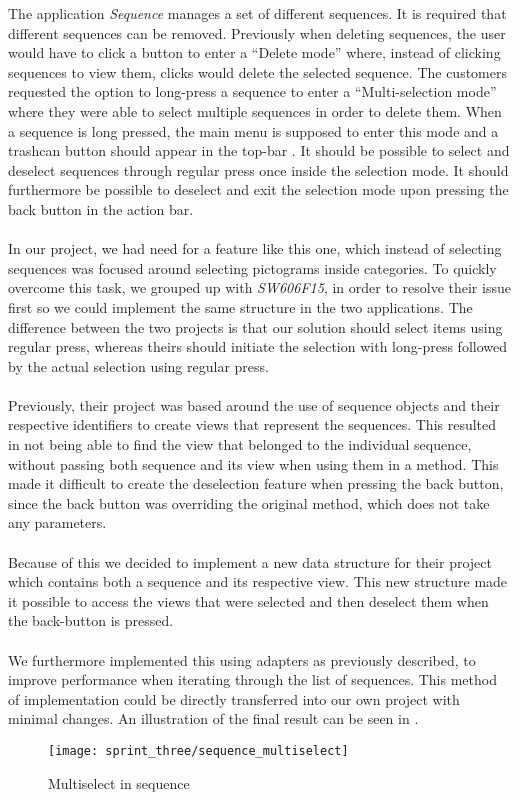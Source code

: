 The application \emph{Sequence} manages a set of different sequences. It is required that different sequences can be removed. Previously when deleting sequences, the user would have to click a button to enter a ``Delete mode'' where, instead of clicking sequences to view them, clicks would delete the selected sequence. The customers requested the option to long-press a sequence to enter a ``Multi-selection mode'' where they were able to select multiple sequences in order to delete them. When a sequence is long pressed, the main menu is supposed to enter this mode and a trashcan button should appear in the top-bar \parencite{android_guidelines_longpress}. It should be possible to select and deselect sequences through regular press once inside the selection mode. It should furthermore be possible to deselect and exit the selection mode upon pressing the back button in the action bar. 
\\\\
In our project, we had need for a feature like this one, which instead of selecting sequences was focused around selecting pictograms inside categories. To quickly overcome this task, we grouped up with \emph{SW606F15}, in order to resolve their issue first so we could implement the same structure in the two applications. The difference between the two projects is that our solution should select items using regular press, whereas theirs should initiate the selection with long-press followed by the actual selection using regular press.
\\\\
Previously, their project was based around the use of sequence objects and their respective identifiers to create views that represent the sequences. This resulted in not being able to find the view that belonged to the individual sequence, without passing both sequence and its view when using them in a method. This made it difficult to create the deselection feature when pressing the back button, since the back button was overriding the original  method, which does not take any parameters.
\\\\ 
Because of this we decided to implement a new data structure for their project which contains both a sequence and its respective view. This new structure made it possible to access the views that were selected and then deselect them when the back-button is pressed. 
\\\\
We furthermore implemented this using adapters as previously described, to improve performance when iterating through the list of sequences. This method of implementation could be directly transferred into our own project with minimal changes. An illustration of the final result can be seen in .

\begin{figure}[!htbp]
	\centering
	\texttt{[image: sprint\_three/sequence\_multiselect]}
	\caption{Multiselect in sequence}
	\label{fig:sequence_multiselect}
\end{figure}